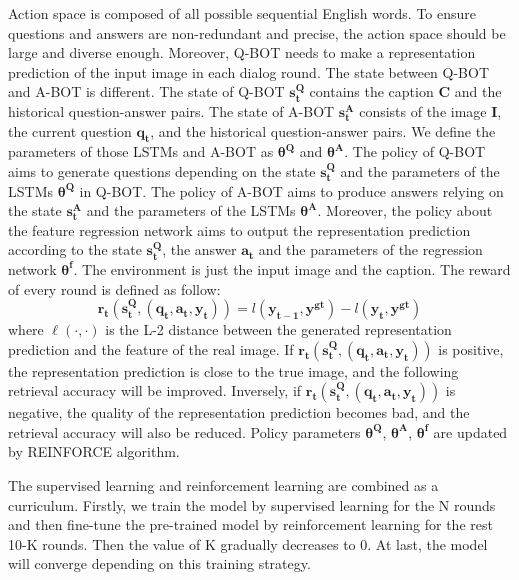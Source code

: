\documentclass[review]{elsarticle}
\begin{document}
	Action space is composed of all possible sequential English words. To ensure questions and answers are non-redundant and precise, the action space should be large and diverse enough. 
	Moreover, Q-BOT needs to make a representation prediction of the input image in each dialog round. 
	The state between Q-BOT and A-BOT is different. The state of Q-BOT $\mathbf{s^{Q}_{t}}$ contains the caption $\textbf{C}$ and the historical question-answer pairs. The state of A-BOT $\mathbf{s^{A}_{t}}$ consists of the image $\textbf{I}$, the current question $\mathbf{q_{t}}$, and the historical question-answer pairs. 
	We define the parameters of those LSTMs and A-BOT as $\mathbf{\theta^{Q}}$ and $\mathbf{\theta^{A}}$. The policy of Q-BOT aims to generate questions depending on the state $\mathbf{s^{Q}_{t}}$ and the parameters of the LSTMs $\mathbf{\theta^{Q}}$ in Q-BOT. 
	The policy of A-BOT aims to produce answers relying on the state $\mathbf{s^{A}_{t}}$ and the parameters of the LSTMs $\mathbf{\theta^{A}}$. Moreover, the policy about the feature regression network aims to output the representation prediction according to the state $\mathbf{s^{Q}_{t}}$, the answer $\mathbf{a_{t}}$ and the parameters of the regression network $\mathbf{\theta^{f}}$. 
	The environment is just the input image and the caption. The reward of every round is defined as follow:
	\begin{equation}
	\mathbf{r_{t}\left(s_{t}^{Q},\left(q_{t}, a_{t}, y_{t}\right)\right)}=l\left(\mathbf{y_{t-1}, y^{g t}}\right)-l\left(\mathbf{y_{t}, y^{g t}}\right)
	\label{Eq5}
	\end{equation}
	where $\ell(\cdot, \cdot)$ is the L-2 distance between the generated representation prediction and the feature of the real image. If $\mathbf{r_{t}\left(s_{t}^{Q},\left(q_{t}, a_{t}, y_{t}\right)\right)}$ is positive, the representation prediction is close to the true image, and the following retrieval accuracy will be improved.
	Inversely, if $\mathbf{r_{t}\left(s_{t}^{Q},\left(q_{t}, a_{t}, y_{t}\right)\right)}$ is negative, the quality of the representation prediction becomes bad, and the retrieval accuracy will also be reduced. 
	Policy parameters $\mathbf{\theta^{Q}}$, $\mathbf{\theta^{A}}$, $\mathbf{\theta^{f}}$ are updated by REINFORCE \cite{DBLP:journals/ml/Williams92} algorithm.	
    
    The supervised learning and reinforcement learning are combined as a curriculum. Firstly, we train the model by supervised learning for the N rounds and then fine-tune the pre-trained model by reinforcement learning for the rest 10-K rounds. Then the value of K gradually decreases to 0. At last, the model will converge depending on this training strategy.
	
\end{document}
